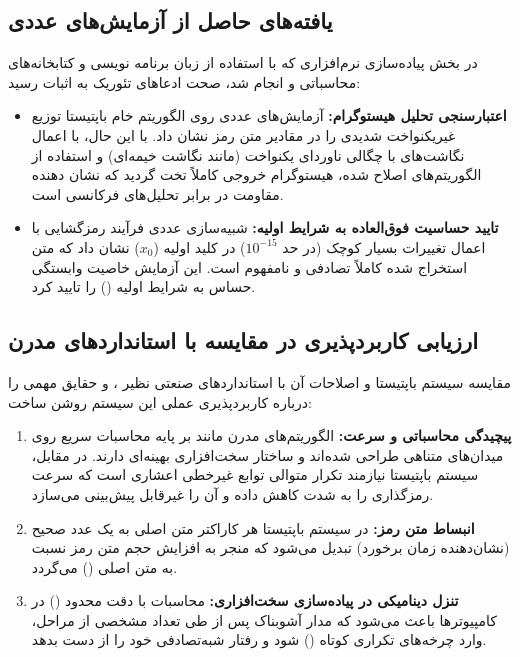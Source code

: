 \documentclass[12pt]{report}
\begin{document}
\subsection{یافته‌های حاصل از آزمایش‌های عددی}
در بخش پیاده‌سازی نرم‌افزاری که با استفاده از زبان برنامه نویسی  و کتابخانه‌های محاسباتی 
 و  انجام شد، صحت ادعاهای تئوریک به اثبات رسید:

\begin{itemize}
    \item \textbf{اعتبارسنجی تحلیل هیستوگرام:} آزمایش‌های عددی روی الگوریتم خام باپتیستا توزیع غیریکنواخت 
    شدیدی را در مقادیر متن رمز نشان داد. با این حال، با اعمال نگاشت‌های با چگالی ناوردای یکنواخت (مانند نگاشت 
    خیمه‌ای) و استفاده از الگوریتم‌های اصلاح شده، هیستوگرام خروجی کاملاً تخت گردید که نشان دهنده مقاومت در 
    برابر تحلیل‌های فرکانسی است.
    
    \item \textbf{تایید حساسیت فوق‌العاده به شرایط اولیه:} شبیه‌سازی عددی فرآیند رمزگشایی با اعمال تغییرات 
    بسیار کوچک (در حد $10^{-15}$) در کلید اولیه ($x_0$) نشان داد که متن استخراج شده کاملاً تصادفی و نامفهوم 
    است. این آزمایش خاصیت وابستگی حساس به شرایط اولیه () را تایید 
    کرد.
\end{itemize}

\subsection{ارزیابی کاربردپذیری در مقایسه با استانداردهای مدرن}
مقایسه سیستم باپتیستا و اصلاحات آن با استانداردهای صنعتی نظیر ،  و  حقایق مهمی 
را درباره کاربردپذیری عملی این سیستم روشن ساخت:

\begin{enumerate}
    \item \textbf{پیچیدگی محاسباتی و سرعت:} الگوریتم‌های مدرن مانند  بر پایه محاسبات سریع روی میدان‌های 
    متناهی طراحی شده‌اند و ساختار سخت‌افزاری بهینه‌ای دارند. در مقابل، سیستم باپتیستا نیازمند تکرار متوالی 
    توابع غیرخطی اعشاری است که سرعت رمزگذاری را به شدت کاهش داده و آن را غیرقابل پیش‌بینی می‌سازد.
    
    \item \textbf{انبساط متن رمز:} در سیستم باپتیستا هر کاراکتر متن اصلی به یک عدد صحیح (نشان‌دهنده زمان 
    برخورد) تبدیل می‌شود که منجر به افزایش حجم متن رمز نسبت به متن اصلی () می‌گردد.
    
    \item \textbf{تنزل دینامیکی در پیاده‌سازی سخت‌افزاری:} محاسبات با دقت محدود () در 
    کامپیوترها باعث می‌شود که مدار آشوبناک پس از طی تعداد مشخصی از مراحل، وارد چرخه‌های تکراری کوتاه 
    () شود و رفتار شبه‌تصادفی خود را از دست بدهد.
\end{enumerate}
\end{document}
